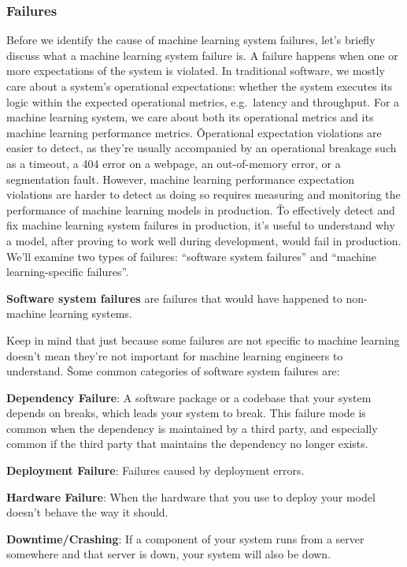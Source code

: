 \subsubsection{Failures}

Before we identify the cause of machine learning system failures, let's briefly discuss what a machine learning
system failure is. A failure happens when one or more expectations of the system is violated. In traditional
software, we mostly care about a system's operational expectations: whether the system executes its logic within
the expected operational metrics, e.g.\ latency and throughput. For a machine learning system, we care about both its
operational metrics and its machine learning performance metrics. \v

Operational expectation violations are easier to detect, as they're usually accompanied by an operational breakage
such as a timeout, a 404 error on a webpage, an out-of-memory error, or a segmentation fault. However, machine
learning performance expectation violations are harder to detect as doing so requires measuring and monitoring the
performance of machine learning models in production. \v

To effectively detect and fix machine learning system failures in production, it's useful to understand why a model,
after proving to work well during development, would fail in production. We'll examine two types of failures:
``software system failures'' and ``machine learning-specific failures''.

\textbf{Software system failures} are failures that would have happened to non-machine learning systems.
\ed

Keep in mind that just because some failures are not specific to machine learning doesn't mean they're not important
for machine learning engineers to understand. \v

Some common categories of software system failures are:
\bit
\item \textbf{Dependency Failure}: A software package or a codebase that your system depends on breaks, which leads your
system to break. This failure mode is common when the dependency is maintained by a third party, and especially common
if the third party that maintains the dependency no longer exists.
\item \textbf{Deployment Failure}: Failures caused by deployment errors.
\item \textbf{Hardware Failure}: When the hardware that you use to deploy your model doesn't behave the way it should.
\item \textbf{Downtime/Crashing}: If a component of your system runs from a server somewhere and that server is down,
your system will also be down.
\eit

